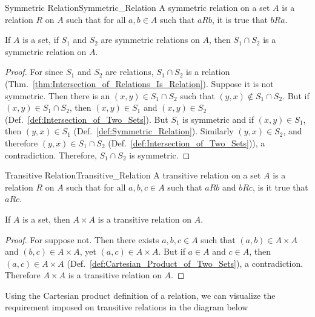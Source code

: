     \begin{fdefinition}{Symmetric Relation}{Symmetric_Relation}
        A symmetric relation on a set $A$ is a
        relation $R$ on $A$ such that for all $a,b\in{A}$
        such that $aRb$, it is true that $bRa$.
    \end{fdefinition}
    \begin{theorem}
        If $A$ is a set, if $S_{1}$ and $S_{2}$ are symmetric relations
        on $A$, then $S_{1}\cap{S}_{2}$ is a symmetric relation on $A$.
    \end{theorem}
    \begin{proof}
        For since $S_{1}$ and $S_{2}$ are relations, $S_{1}\cap{S}_{2}$ is a
        relation (Thm.~\ref{thm:Intersection_of_Relations_Is_Relation}). Suppose
        it is not symmetric. Then there is an $(x,y)\in{S}_{1}\cap{S}_{2}$ such
        that $(y,x)\notin{S}_{1}\cap{S}_{2}$. But if
        $(x,y)\in{S}_{1}\cap{S}_{2}$, then $(x,y)\in{S}_{1}$ and
        $(x,y)\in{S}_{2}$ (Def.~\ref{def:Intersection_of_Two_Sets}). But $S_{1}$
        is symmetric and if $(x,y)\in{S}_{1}$, then $(y,x)\in{S}_{1}$
        (Def.~\ref{def:Symmetric_Relation}). Similarly $(y,x)\in{S}_{2}$, and
        therefore $(y,x)\in{S}_{1}\cap{S}_{2}$
        (Def.~\ref{def:Intersection_of_Two_Sets})), a contradiction. Therefore,
        $S_{1}\cap{S}_{2}$ is symmetric.
    \end{proof}
    \begin{fdefinition}{Transitive Relation}{Transitive_Relation}
        A transitive relation on a set $A$ is a relation $R$ on $A$
        such that for all $a,b,c\in{A}$ such that $aRb$ and $bRc$,
        is it true that $aRc$.
    \end{fdefinition}
    \begin{theorem}
        \label{thm:Entire_Cartesian_is_Transitive}%
        If $A$ is a set, then $A\times{A}$ is a transitive relation on $A$.
    \end{theorem}
    \begin{proof}
        For suppose not. Then there exists $a,b,c\in{A}$ such that
        $(a,b)\in{A}\times{A}$ and $(b,c)\in{A}\times{A}$, yet
        $(a,c)\in{A}\times{A}$. But if $a\in{A}$ and $c\in{A}$, then
        $(a,c)\in{A}\times{A}$ (Def.~\ref{def:Cartesian_Product_of_Two_Sets}), a
        contradiction. Therefore $A\times{A}$ is a transitive relation on $A$.
    \end{proof}
    Using the Cartesian product definition of a relation, we can visualize the
    requirement imposed on transitive relations in the diagram below
